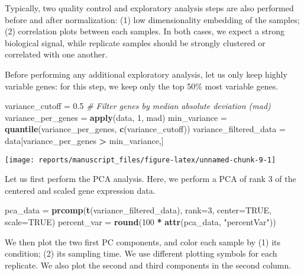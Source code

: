 \documentclass[9pt,a4paper,]{extarticle}
\newenvironment{Shaded}{\begin{snugshade}}{\end{snugshade}}
\newcommand{\CommentTok}[1]{\textcolor[rgb]{0.56,0.35,0.01}{\textit{#1}}}
\newcommand{\DataTypeTok}[1]{\textcolor[rgb]{0.13,0.29,0.53}{#1}}
\newcommand{\DecValTok}[1]{\textcolor[rgb]{0.00,0.00,0.81}{#1}}
\newcommand{\FloatTok}[1]{\textcolor[rgb]{0.00,0.00,0.81}{#1}}
\newcommand{\KeywordTok}[1]{\textcolor[rgb]{0.13,0.29,0.53}{\textbf{#1}}}
\newcommand{\NormalTok}[1]{#1}
\newcommand{\OperatorTok}[1]{\textcolor[rgb]{0.81,0.36,0.00}{\textbf{#1}}}
\newcommand{\OtherTok}[1]{\textcolor[rgb]{0.56,0.35,0.01}{#1}}
\newcommand{\StringTok}[1]{\textcolor[rgb]{0.31,0.60,0.02}{#1}}
\begin{document}
Typically, two quality control and exploratory analysis steps are also
performed before and after normalization: (1) low dimensionality embedding of
the samples; (2) correlation plots between each samples. In both cases, we
expect a strong biological signal, while replicate samples should be strongly
clustered or correlated with one another.

Before performing any additional exploratory analysis, let us only keep highly
variable genes: for this step, we keep only the top 50\% most variable genes.

\begin{Shaded}
\begin{Highlighting}[]
\NormalTok{variance_cutoff =}\StringTok{ }\FloatTok{0.5}
\CommentTok{# Filter genes by median absolute deviation (mad)}
\NormalTok{variance_per_genes =}\StringTok{ }\KeywordTok{apply}\NormalTok{(data, }\DecValTok{1}\NormalTok{, mad)}
\NormalTok{min_variance =}\StringTok{ }\KeywordTok{quantile}\NormalTok{(variance_per_genes, }\KeywordTok{c}\NormalTok{(variance_cutoff))}
\NormalTok{variance_filtered_data =}\StringTok{ }\NormalTok{data[variance_per_genes }\OperatorTok{>}\StringTok{ }\NormalTok{min_variance,]}
\end{Highlighting}
\end{Shaded}

\begin{center}\texttt{[image: reports/manuscript\_files/figure-latex/unnamed-chunk-9-1]} \end{center}

Let us first perform the PCA analysis. Here, we perform a PCA of rank 3 of the
centered and scaled gene expression data.

\begin{Shaded}
\begin{Highlighting}[]
\NormalTok{pca_data =}\StringTok{ }\KeywordTok{prcomp}\NormalTok{(}\KeywordTok{t}\NormalTok{(variance_filtered_data), }\DataTypeTok{rank=}\DecValTok{3}\NormalTok{, }\DataTypeTok{center=}\OtherTok{TRUE}\NormalTok{, }\DataTypeTok{scale=}\OtherTok{TRUE}\NormalTok{) }
\NormalTok{percent_var =}\StringTok{ }\KeywordTok{round}\NormalTok{(}\DecValTok{100} \OperatorTok{*}\StringTok{ }\KeywordTok{attr}\NormalTok{(pca_data, }\StringTok{"percentVar"}\NormalTok{))}
\end{Highlighting}
\end{Shaded}

We then plot the two first PC components, and color each sample by (1) its
condition; (2) its sampling time. We use different plotting symbols for each
replicate. We also plot the second and third components in the second column.
\end{document}
